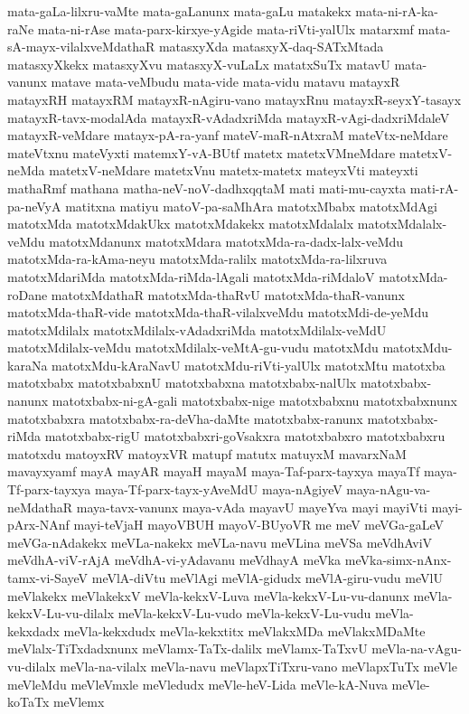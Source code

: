 {mata-gaLa-lilxru-vaMte
mata-gaLanunx
mata-gaLu
matakekx
mata-ni-rA-ka-raNe
mata-ni-rAse
mata-parx-kirxye-yAgide
mata-riVti-yalUlx
matarxmf
mata-sA-mayx-vilalxveMdathaR
matasxyXda
matasxyX-daq-SATxMtada
matasxyXkekx
matasxyXvu
matasxyX-vuLaLx
matatxSuTx
matavU
mata-vanunx
matave
mata-veMbudu
mata-vide
mata-vidu
matavu
matayxR
matayxRH
matayxRM
matayxR-nAgiru-vano
matayxRnu
matayxR-seyxY-tasayx
matayxR-tavx-modalAda
matayxR-vAdadxriMda
matayxR-vAgi-dadxriMdaleV
matayxR-veMdare
matayx-pA-ra-yanf
mateV-maR-nAtxraM
mateVtx-neMdare
mateVtxnu
mateVyxti
matemxY-vA-BUtf
matetx
matetxVMneMdare
matetxV-neMda
matetxV-neMdare
matetxVnu
matetx-matetx
mateyxVti
mateyxti
mathaRmf
mathana
matha-neV-noV-dadhxqqtaM
mati
mati-mu-cayxta
mati-rA-pa-neVyA
matitxna
matiyu
matoV-pa-saMhAra
matotxMbabx
matotxMdAgi
matotxMda
matotxMdakUkx
matotxMdakekx
matotxMdalalx
matotxMdalalx-veMdu
matotxMdanunx
matotxMdara
matotxMda-ra-dadx-lalx-veMdu
matotxMda-ra-kAma-neyu
matotxMda-ralilx
matotxMda-ra-lilxruva
matotxMdariMda
matotxMda-riMda-lAgali
matotxMda-riMdaloV
matotxMda-roDane
matotxMdathaR
matotxMda-thaRvU
matotxMda-thaR-vanunx
matotxMda-thaR-vide
matotxMda-thaR-vilalxveMdu
matotxMdi-de-yeMdu
matotxMdilalx
matotxMdilalx-vAdadxriMda
matotxMdilalx-veMdU
matotxMdilalx-veMdu
matotxMdilalx-veMtA-gu-vudu
matotxMdu
matotxMdu-karaNa
matotxMdu-kAraNavU
matotxMdu-riVti-yalUlx
matotxMtu
matotxba
matotxbabx
matotxbabxnU
matotxbabxna
matotxbabx-nalUlx
matotxbabx-nanunx
matotxbabx-ni-gA-gali
matotxbabx-nige
matotxbabxnu
matotxbabxnunx
matotxbabxra
matotxbabx-ra-deVha-daMte
matotxbabx-ranunx
matotxbabx-riMda
matotxbabx-rigU
matotxbabxri-goVsakxra
matotxbabxro
matotxbabxru
matotxdu
matoyxRV
matoyxVR
matupf
matutx
matuyxM
mavarxNaM
mavayxyamf
mayA
mayAR
mayaH
mayaM
maya-Taf-parx-tayxya
mayaTf
maya-Tf-parx-tayxya
maya-Tf-parx-tayx-yAveMdU
maya-nAgiyeV
maya-nAgu-va-neMdathaR
maya-tavx-vanunx
maya-vAda
mayavU
mayeYva
mayi
mayiVti
mayi-pArx-NAnf
mayi-teVjaH
mayoVBUH
mayoV-BUyoVR
me
meV
meVGa-gaLeV
meVGa-nAdakekx
meVLa-nakekx
meVLa-navu
meVLina
meVSa
meVdhAviV
meVdhA-viV-rAjA
meVdhA-vi-yAdavanu
meVdhayA
meVka
meVka-simx-nAnx-tamx-vi-SayeV
meVlA-diVtu
meVlAgi
meVlA-gidudx
meVlA-giru-vudu
meVlU
meVlakekx
meVlakekxV
meVla-kekxV-Luva
meVla-kekxV-Lu-vu-danunx
meVla-kekxV-Lu-vu-dilalx
meVla-kekxV-Lu-vudo
meVla-kekxV-Lu-vudu
meVla-kekxdadx
meVla-kekxdudx
meVla-kekxtitx
meVlakxMDa
meVlakxMDaMte
meVlalx-TiTxdadxnunx
meVlamx-TaTx-dalilx
meVlamx-TaTxvU
meVla-na-vAgu-vu-dilalx
meVla-na-vilalx
meVla-navu
meVlapxTiTxru-vano
meVlapxTuTx
meVle
meVleMdu
meVleVmxle
meVledudx
meVle-heV-Lida
meVle-kA-Nuva
meVle-koTaTx
meVlemx
}
